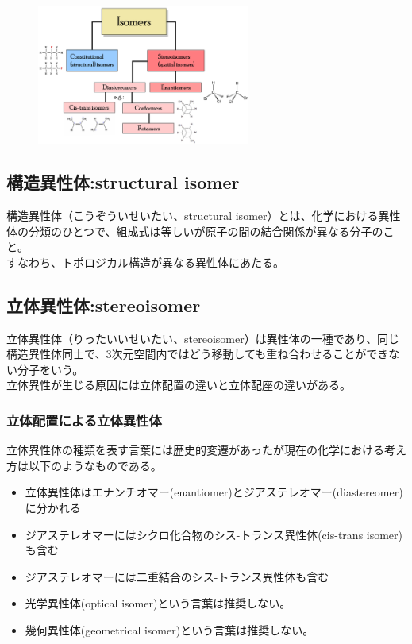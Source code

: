 \documentclass[dvipdfmx,uplatex,twocolumn,10pt]{jsarticle}
\begin{document}
\begin{figure}[htbp]
\begin{center}
\includegraphics[width=70mm]{600px-Isomerism.png}
\end{center}
\end{figure}

\subsection{構造異性体:structural isomer}
構造異性体（こうぞういせいたい、structural isomer）とは、化学における異性体の分類のひとつで、組成式は等しいが原子の間の結合関係が異なる分子のこと。 \\
すなわち、トポロジカル構造が異なる異性体にあたる。 \\

\subsection{立体異性体:stereoisomer}
立体異性体（りったいいせいたい、stereoisomer）は異性体の一種であり、同じ構造異性体同士で、3次元空間内ではどう移動しても重ね合わせることができない分子をいう。 \\
立体異性が生じる原因には立体配置の違いと立体配座の違いがある。

\subsubsection{立体配置による立体異性体}

立体異性体の種類を表す言葉には歴史的変遷があったが現在の化学における考え方は以下のようなものである。
\begin{itemize}
\item 立体異性体はエナンチオマー(enantiomer)とジアステレオマー(diastereomer)に分かれる
\item ジアステレオマーにはシクロ化合物のシス-トランス異性体(cis-trans isomer)も含む
\item ジアステレオマーには二重結合のシス-トランス異性体も含む
\item 光学異性体(optical isomer)という言葉は推奨しない。
\item 幾何異性体(geometrical isomer)という言葉は推奨しない。
\end{itemize}
\end{document}
